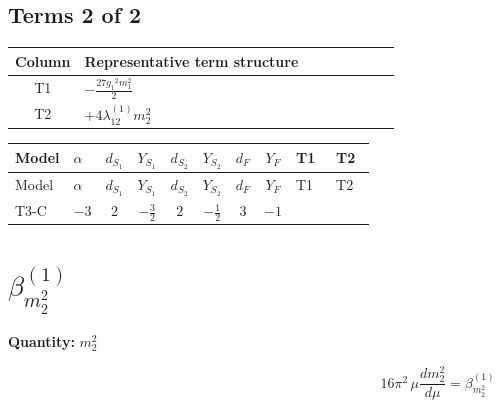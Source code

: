 \documentclass[8pt]{article}
\begin{document}
\begin{landscape}
\subsection*{Terms 2 of 2}
\begin{center}
\begin{tabular}{@{}c >{\raggedright\arraybackslash}p{0.82\linewidth}@{}}
\toprule
Column & Representative term structure \\
\midrule
T1 & \(\displaystyle -\frac{27 {g_1}^2 {m_1^2}}{2}\) \\
\midrule
T2 & \(\displaystyle +4 {\lambda_{12}^{(1)}} {m_2^2}\) \\
\midrule
\bottomrule
\end{tabular}
\end{center}
\smallskip
\tiny
\begin{longtable}{@{}llcccccc >{\raggedright\arraybackslash}p{0.21\linewidth} >{\raggedright\arraybackslash}p{0.21\linewidth}@{}}
\toprule
Model & $\alpha$ & $d_{S_1}$ & $Y_{S_1}$ & $d_{S_2}$ & $Y_{S_2}$ & $d_F$ & $Y_F$ & T1 & T2 \\
\midrule
\endfirsthead
\toprule
Model & $\alpha$ & $d_{S_1}$ & $Y_{S_1}$ & $d_{S_2}$ & $Y_{S_2}$ & $d_F$ & $Y_F$ & T1 & T2 \\
\midrule
\endhead
T3-C & $-3$ & $2$ & $-\frac{3}{2}$ & $2$ & $-\frac{1}{2}$ & $3$ & $-1$ & \scriptsize\adjustbox{max width=\linewidth}{$\begin{gathered} -\frac{27 {g_1}^2 {m_1^2}}{2}\end{gathered}$} & \scriptsize\adjustbox{max width=\linewidth}{$\begin{gathered} +4 {\lambda_{12}^{(1)}} {m_2^2}\end{gathered}$} \\
\midrule
\bottomrule
\end{longtable}
\clearpage
\section*{$\beta_{m_2^2}^{(1)}$}
\noindent\textbf{Quantity: }$m_2^2$\par\smallskip
\[16\pi^2\,\mu\frac{d m_2^2}{d\mu}=\beta_{m_2^2}^{(1)}\]

\end{landscape}
\end{document}
